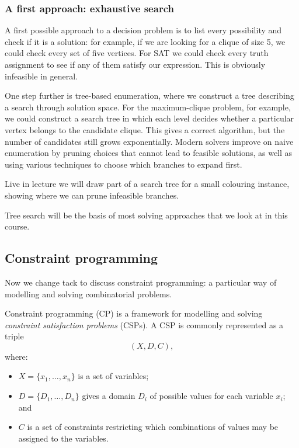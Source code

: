 \documentclass[11pt]{article}
\begin{document}
\subsubsection{A first approach: exhaustive search}

A first possible approach to a decision problem is to list every possibility and check if it is a solution: for example, if we are looking for a clique of size 5, we could check every set of five vertices.  For SAT we could check every truth assignment to see if any of them satisfy our expression.  This is obviously infeasible in general. 

One step further is tree-based enumeration, where we construct a tree describing a search through solution space.  For the
maximum-clique problem, for example, we could construct a search tree in which
each level decides whether a particular vertex belongs to the candidate clique.
This gives a correct algorithm, but the number of candidates still grows
exponentially. Modern solvers improve on naive enumeration by pruning choices
that cannot lead to feasible solutions, as well as using various techniques to choose which branches to expand first.  

Live in lecture we will draw part of a search tree for a small colouring instance, showing where we can prune infeasible branches. 

Tree search will be the basis of most solving approaches that we look at in this course.

\subsection{Constraint programming}
Now we change tack to discuss constraint programming: a particular way of modelling and solving combinatorial problems.  

Constraint programming (CP) is a framework for modelling and solving
\emph{constraint satisfaction problems} (CSPs). A CSP is commonly represented
as a triple
\[
    (X,D,C),
\]
where:
\begin{itemize}
    \item $X=\{x_1,\ldots,x_n\}$ is a set of variables;
    \item $D=\{D_1,\ldots,D_n\}$ gives a domain $D_i$ of possible values for
    each variable $x_i$; and
    \item $C$ is a set of constraints restricting which combinations of values
    may be assigned to the variables.
\end{itemize}
\end{document}
